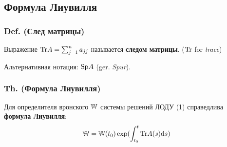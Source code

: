 \subsection{Формула
Лиувилля}\label{ux444ux43eux440ux43cux443ux43bux430-ux43bux438ux443ux432ux438ux43bux43bux44f}

\subsubsection{Def. (След
матрицы)}\label{def.-ux441ux43bux435ux434-ux43cux430ux442ux440ux438ux446ux44b}

Выражение \(\mathrm{Tr} A = \sum_{j=1}^n a_{j j}\) называется \textbf{следом
матрицы}. (\(\mathrm{Tr}\) for \emph{trace})

Альтернативная нотация: \(\mathrm{Sp} A\) (ger. \emph{Spur}).

\subsubsection{Th. (Формула
Лиувилля)}\label{th.-ux444ux43eux440ux43cux443ux43bux430-ux43bux438ux443ux432ux438ux43bux43bux44f}

Для определителя вронского \(\mathbb W\) системы решений ЛОДУ (1) справедлива
\textbf{формула Лиувилля}:
\[ \mathbb W = \mathbb W(t_0) \exp(\int_{t_0}^t \mathrm{Tr} A(s) \mathrm{d} s) \]

